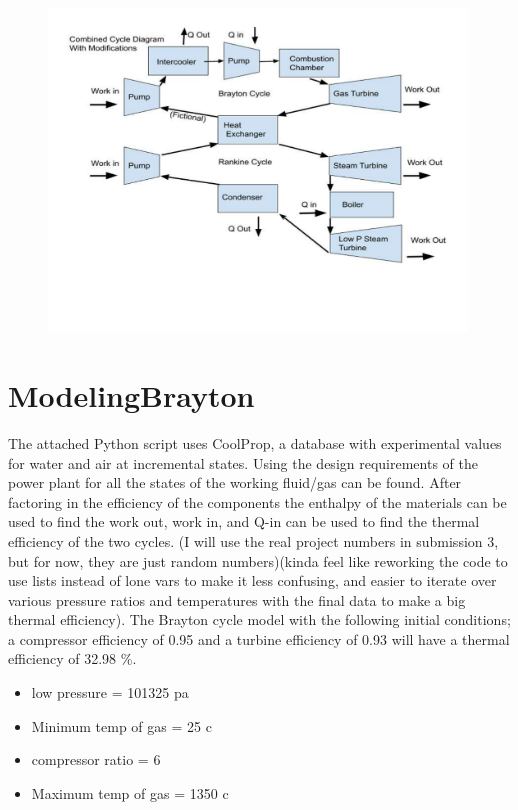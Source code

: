 \documentclass{article}
\begin{document}
\begin{figure}[!htbp]
\centering
  \includegraphics[page=1,trim=10mm 0mm 10mm 0mm,clip,width=0.99\textwidth]{Figures/Copy of Combined Cycle Diagram.pdf}
  \caption{}
  \label{fig:epsfig}
\end{figure}

\FloatBarrier

\section{ModelingBrayton}

The attached Python script uses CoolProp, a database with experimental values for water and air at incremental states. Using the design requirements of the power plant for all the states of the working fluid/gas can be found. After factoring in the efficiency of the components the enthalpy of the materials can be used to find the work out, work in, and Q-in can be used to find the thermal efficiency of the two cycles. (I will use the real project numbers in submission 3, but for now, they are just random numbers)(kinda feel like reworking the code to use lists instead of lone vars to make it less confusing, and easier to iterate over various pressure ratios and temperatures with the final data to make a big thermal efficiency). The Brayton cycle model with the following initial conditions; a compressor efficiency of 0.95 and a turbine efficiency of 0.93 will have a thermal efficiency of 32.98 \%.
\begin{itemize}
\item  low pressure = 101325 pa
\item Minimum temp of gas = 25 c
\item compressor ratio = 6
\item Maximum temp of gas = 1350 c
\end{itemize}
\end{document}
